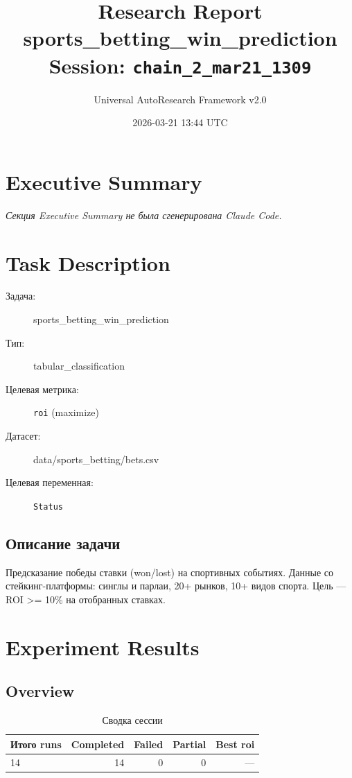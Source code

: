 \documentclass[12pt,a4paper]{article}
\title{
    \Large\textbf{Research Report}\\[0.5em]
    \large sports\_betting\_win\_prediction\\[0.3em]
    \normalsize Session: \texttt{chain\_2\_mar21\_1309}
}
\author{Universal AutoResearch Framework v2.0}
\date{2026-03-21 13:44 UTC}
\begin{document}
\maketitle
\tableofcontents
\newpage


\section{Executive Summary}

\textit{Секция Executive Summary не была сгенерирована Claude Code.}



\section{Task Description}

\begin{description}
    \item[Задача:] sports\_betting\_win\_prediction
    \item[Тип:] tabular\_classification
    \item[Целевая метрика:] \texttt{roi}
        (maximize)
    \item[Датасет:] data/sports\_betting/bets.csv
    \item[Целевая переменная:] \texttt{Status}
\end{description}

\subsection*{Описание задачи}
Предсказание победы ставки (won/lost) на спортивных событиях. Данные со стейкинг-платформы: синглы и парлаи, 20+ рынков, 10+ видов спорта. Цель — ROI >= 10\% на отобранных ставках.




\section{Experiment Results}

\subsection{Overview}

\begin{table}[H]
\centering
\caption{Сводка сессии}
\begin{tabular}{lrrrr}
\toprule
Итого runs & Completed & Failed & Partial & Best roi \\
\midrule
14 & \textcolor{passcolor}{14}
    & \textcolor{failcolor}{0}
    & \textcolor{partialcolor}{0}
    & --- \\
\bottomrule
\end{tabular}
\end{table}
\end{document}
